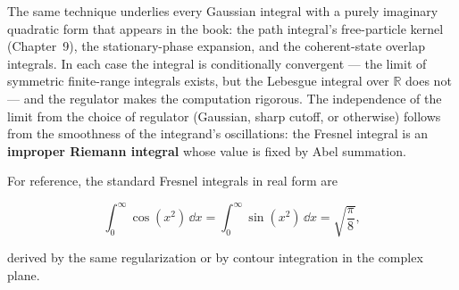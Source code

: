The same technique underlies every Gaussian integral with a purely imaginary quadratic form that appears in the book: the path integral's free-particle kernel (Chapter~9), the stationary-phase expansion, and the coherent-state overlap integrals. In each case the integral is conditionally convergent --- the limit of symmetric finite-range integrals exists, but the Lebesgue integral over $\mathbb{R}$ does not --- and the regulator makes the computation rigorous. The independence of the limit from the choice of regulator (Gaussian, sharp cutoff, or otherwise) follows from the smoothness of the integrand's oscillations: the Fresnel integral is an \textbf{improper Riemann integral} whose value is fixed by Abel summation.

For reference, the standard Fresnel integrals in real form are
\begin{linenomath}
    \begin{equation}
        \int_0^\infty \cos(x^2)\,\dd x = \int_0^\infty \sin(x^2)\,\dd x = \sqrt{\frac{\pi}{8}},
        \label{eq:fresnel-real}
    \end{equation}
\end{linenomath}
derived by the same regularization or by contour integration in the complex plane.
